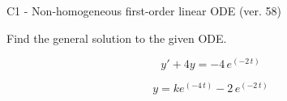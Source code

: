 \begin{exercise}
  \begin{exerciseTitle}C1 - Non-homogeneous first-order linear ODE (ver. 58)\end{exerciseTitle}
  \begin{exerciseStatement}
    
Find the general solution to the given ODE.

    
\[y'+4y= -4 \, e^{\left(-2 \, t\right)}\]

  \end{exerciseStatement}
  \begin{exerciseAnswer}
    
\[y= k e^{\left(-4 \, t\right)} - 2 \, e^{\left(-2 \, t\right)}\]

  \end{exerciseAnswer}
\end{exercise}
